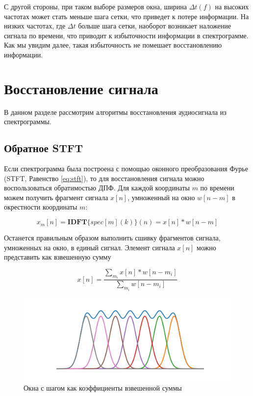 С другой стороны, при таком выборе размеров окна, ширина $\Delta t(f)$ на высоких частотах может стать меньше шага сетки, что приведет к потере информации.
На низких частотах, где $\Delta t$ больше шага сетки, наоборот возникает наложение сигнала по времени, что приводит к избыточности информации в спектрограмме. 
Как мы увидим далее, такая избыточность не помешает восстановлению информации.


\section{Восстановление сигнала}
В данном разделе рассмотрим алгоритмы восстановления аудиосигнала из спектрограммы.

\subsection{Обратное STFT}

Если спектрограмма была построена с помощью оконного преобразования Фурье (STFT, Равенство \ref{eq:stft}), то для восстановления сигнала можно воспользоваться обратимостью ДПФ.
Для каждой координаты $m$ по времени можем получить фрагмент сигнала $x[n]$, умноженный на окно $w[n-m]$ в окрестности координаты $m$: 

\begin{equation}
  x_m[n] = \textbf{IDFT}\{spec[m](k)\}(n) = x[n]*w[n - m]
  \label{eq:idft}
\end{equation}

Останется правильным образом выполнить сшивку фрагментов сигнала, умноженных на окно, в единый сигнал.
Элемент сигнала $x[n]$ можно представить как взвешенную сумму

\begin{equation}
  x[n] = \frac{\sum_{m_i} x[n]*w[n-m_i]}{\sum_{m_i} w[n-m_i]}
  \label{eq:weighted_sum_stft}
\end{equation}

\begin{figure}
  \centering
  \includegraphics[width=0.8\linewidth]{figures/windows_sum}
  \caption{Окна с шагом как коэффициенты взвешенной суммы}
  \label{fig:windows_sum}
\end{figure}

